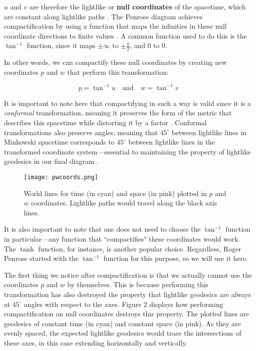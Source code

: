 \documentclass{article}
\begin{document}
$u$ and $v$ are therefore the lightlike or \textbf{null coordinates} of the spacetime, which are constant along lightlike paths \cite{minkowski_penrose_desc}. The Penrose diagram achieves compactification by using a function that maps the infinities in these null coordinate directions to finite values \cite{pythondraw}. A common function used to do this is the $\tan^{-1}$ function, since it maps $\pm \infty$ to $\pm \frac{\pi}{2}$, and 0 to 0.

In other words, we can compactify these null coordinates by creating new coordinates $p$ and $w$ that perform this transformation:

\begin{equation}
    p = \tan^{-1} u
    \quad \text{and}\quad
    w = \tan^{-1} v
\end{equation}

It is important to note here that compactifying in such a way is valid since it is a \textit{conformal} transformation, meaning it preserves the form of the metric that describes this spacetime while distorting it by a factor \cite{minkowski_penrose_desc}. Conformal transformations also preserve angles, meaning that $45^{\circ}$ between lightlike lines in Minkowski spacetime corresponds to $45^{\circ}$ between lightlike lines in the transformed coordinate system---essential to maintaining the property of lightlike geodesics in our final diagram \cite{minkowski_penrose_desc}.

\begin{wrapfigure}{r}{0.4\textwidth}
\vspace{-10pt}
\texttt{[image: pwcoords.png]} 
\caption{World lines for time (in cyan) and space (in pink) plotted in $p$ and $w$ coordinates. Lightlike paths would travel along the black axis lines.}
\label{fig:compactify}
\vspace{-10pt}
\end{wrapfigure}

It is also important to note that one does not need to choose the $\tan^{-1}$ function in particular---any function that ``compactifies" these coordinates would work. The $\tanh$ function, for instance, is another popular choice. Regardless, Roger Penrose started with the $\tan^{-1}$ function for this purpose, so we will use it here. 


The first thing we notice after compactification is that we actually cannot use the coordinates $p$ and $w$ by themselves. This is because performing this transformation has also destroyed the property that lightlike geodesics are always at $45^{\circ}$ angles with respect to the axes. Figure 2 displays how performing compactification on null coordinates destroys this property. The plotted lines are geodesics of constant time (in cyan) and constant space (in pink). As they are evenly spaced, the expected lightlike geodesics would trace the intersections of these axes, in this case extending horizontally and vertically.
\end{document}

